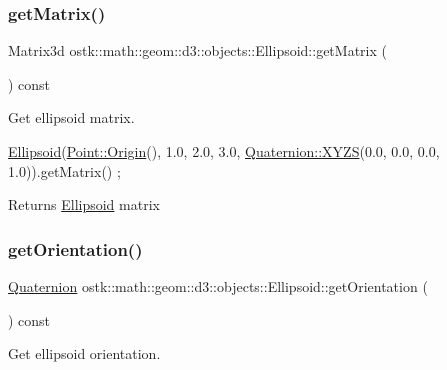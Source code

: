 \subsubsection{\texorpdfstring{get\+Matrix()}{getMatrix()}}
{\footnotesize\ttfamily Matrix3d ostk\+::math\+::geom\+::d3\+::objects\+::\+Ellipsoid\+::get\+Matrix (\begin{DoxyParamCaption}{ }\end{DoxyParamCaption}) const}



Get ellipsoid matrix. 


\begin{DoxyCode}
\hyperlink{classostk_1_1math_1_1geom_1_1d3_1_1objects_1_1_ellipsoid_acd84276f65a14db12623402a411712b7}{Ellipsoid}(\hyperlink{classostk_1_1math_1_1geom_1_1d3_1_1objects_1_1_point_a079c199f08b015d456d02728a71b534c}{Point::Origin}(), 1.0, 2.0, 3.0, \hyperlink{classostk_1_1math_1_1geom_1_1d3_1_1trf_1_1rot_1_1_quaternion_ac57ea57a4033622ed1389101b2e58c76}{Quaternion::XYZS}(0.0, 0.0, 
      0.0, 1.0)).getMatrix() ;
\end{DoxyCode}


\begin{DoxyReturn}{Returns}
\hyperlink{classostk_1_1math_1_1geom_1_1d3_1_1objects_1_1_ellipsoid}{Ellipsoid} matrix 
\end{DoxyReturn}
\mbox{\label{classostk_1_1math_1_1geom_1_1d3_1_1objects_1_1_ellipsoid_a3e273d94d0ff1d40e3588d5ee2366ec9}} 
\subsubsection{\texorpdfstring{get\+Orientation()}{getOrientation()}}
{\footnotesize\ttfamily \hyperlink{classostk_1_1math_1_1geom_1_1d3_1_1trf_1_1rot_1_1_quaternion}{Quaternion} ostk\+::math\+::geom\+::d3\+::objects\+::\+Ellipsoid\+::get\+Orientation (\begin{DoxyParamCaption}{ }\end{DoxyParamCaption}) const}



Get ellipsoid orientation. 


